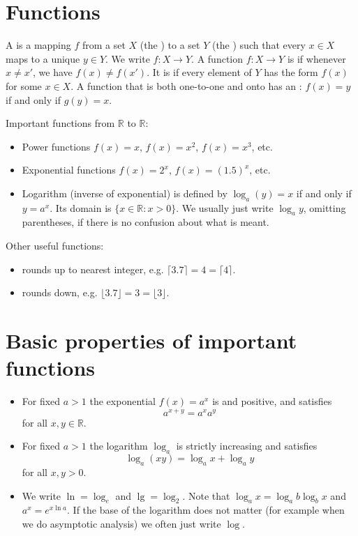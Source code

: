 \section{Functions}
A  is a mapping $f$ from a set $X$ (the ) to a set $Y$ (the ) such that every $x \in X$ maps to a unique $y \in Y$. 
We write $f \colon X \to Y$. A function $f \colon X \to Y$ is  if whenever $x \neq x'$, we have $f(x) \neq f(x')$.
It is  if every element of $Y$ has the form $f(x)$ for some $x \in X$. 
A function that is both one-to-one and onto has an : $f(x) = y$ if and only if $g(y) = x$. 

Important functions from $\mathbb{R}$ to $\mathbb{R}$: 
\begin{itemize}
\item Power functions $f(x) = x$, $f(x) = x^2$, $f(x) = x^3$, etc.
\item Exponential functions $f(x) = 2^x$, $f(x) = (1.5)^x$, etc.
\item Logarithm (inverse of exponential) is defined by $\log_a (y) = x$ if and only if $y = a^x$. 
Its domain is $\{x\in \mathbb{R} : x > 0\}$. We usually just write $\log_a y$, omitting parentheses, if there is no confusion about what is meant.
\end{itemize}

Other useful functions: 
\begin{itemize}
\item {} rounds up to nearest integer, e.g. $\lceil 3.7 \rceil = 4 = \lceil 4 \rceil$.
\item {} rounds down, e.g. $\lfloor 3.7 \rfloor = 3 = \lfloor 3 \rfloor$.
\end{itemize}


\section{Basic properties of important functions}
\begin{itemize}
\item For fixed $a>1$ the exponential $f(x) = a^x$ is  and positive, 
and satisfies $$a^{x+y} = a^x a^y$$ for all $x,y\in \mathbb{R}$. 
\item For fixed $a>1$ the logarithm $\log_a$ is strictly increasing and satisfies 
$$\log_a(xy) = \log_a x + \log_a y$$ for all $x,y>0$.
\item We write $\ln = \log_e$ and $\lg = \log_2$. Note that $\log_a x = \log_a b \log_b x$ and $a^x = e^{x\ln a}$. 
If the base of the logarithm does not matter (for example when we do asymptotic analysis) we often just write $\log$.
\end{itemize}

